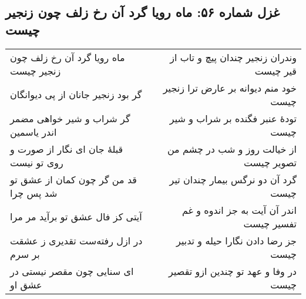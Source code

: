 \begin{center}
\section*{غزل شماره ۵۶: ماه رویا گرد آن رخ زلف چون زنجیر چیست}
\label{sec:056}
\begin{longtable}{l p{0.5cm} r}
ماه رویا گرد آن رخ زلف چون زنجیر چیست
&&
وندران زنجیر چندان پیچ و تاب از قیر چیست
\\
گر بود زنجیر جانان از پی دیوانگان
&&
خود منم دیوانه بر عارض ترا زنجیر چیست
\\
گر شراب و شیر خواهی مضمر اندر یاسمین
&&
تودهٔ عنبر فگنده بر شراب و شیر چیست
\\
قبلهٔ جان ای نگار از صورت و روی تو نیست
&&
از خیالت روز و شب در چشم من تصویر چیست
\\
قد من گر چون کمان از عشق تو شد پس چرا
&&
گرد آن دو نرگس بیمار چندان تیر چیست
\\
آیتی کز فال عشق تو برآید مر مرا
&&
اندر آن آیت به جز اندوه و غم تفسیر چیست
\\
در ازل رفته‌ست تقدیری ز عشقت بر سرم
&&
جز رضا دادن نگارا حیله و تدبیر چیست
\\
ای سنایی چون مقصر نیستی در عشق او
&&
در وفا و عهد تو چندین ازو تقصیر چیست
\\
\end{longtable}
\end{center}
